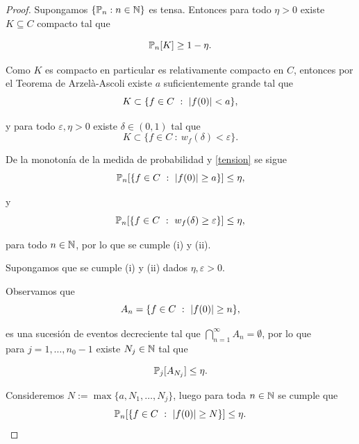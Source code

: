 \documentclass[12pt,oneside]{book}
\numberwithin{equation}{chapter}
\begin{document}
\begin{proof}
    Supongamos $\{\PP_n:n\in \N\}$ es tensa. Entonces para todo $\eta>0$ existe $K\subseteq C$ compacto tal que 
        
    \begin{equation}
    \label{tension}
    \PP_n[K]\geq 1-\eta.
    \end{equation}
    
    Como $K$ es compacto en particular es relativamente compacto en $C$, entonces por el Teorema de Arzelà-Ascoli existe $a$ suficientemente grande tal que 
    \begin{equation*}
    K\subset\{f\in C\ :\ \lvert f(0)\rvert< a\},
    \end{equation*}
    
    y para todo $\varepsilon,\eta>0$ existe $\delta\in (0,1)$ tal que 
    \begin{equation*}
    K\subset\{f\in C\ :\ w_f(\delta)< \varepsilon\}.
    \end{equation*}
    
    De la monotonía de la medida de probabilidad y \eqref{tension} se sigue 
    \begin{equation*}
    \PP_n[\{f\in C\ :\ \abs{f(0)}\geq a\}]\leq \eta,
    \end{equation*}
    
    y
    \begin{equation*}
    \PP_n[\{f\in C\ :\ w_f(\delta)\geq \varepsilon\}]\leq \eta,
    \end{equation*}
    
    para todo $n\in\N$, por lo que se cumple (i) y (ii).
    
    Supongamos que se cumple (i) y (ii) dados $\eta,\varepsilon>0$.
    
    Observamos que 
    \begin{equation*}
    A_n=\{f\in C\ :\ \abs{f(0)}\geq n\},
    \end{equation*}
    
    es una sucesión de eventos decreciente tal que $\bigcap_{n=1}^{\infty}A_n=\emptyset$, por lo que\\ para $j=1,\dots,n_0-1$ existe $N_j\in\N$ tal que 
    
    \begin{equation*}
    \PP_j[A_{N_j}]\leq \eta.
    \end{equation*}
    
    Consideremos $N:=\max\{a,N_1,\dots,N_j\}$, luego para toda $n\in\N$ se cumple que 
    \begin{equation}
    \label{desigualdad numeral 1}
    \PP_n[\{f\in C\ :\ \abs{f(0)}\geq N\}]\leq \eta.
    \end{equation}
    

\end{proof}
\end{document}

